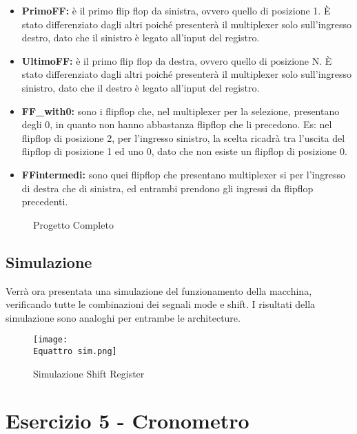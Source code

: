 \documentclass[12pt]{article}
\def \Equattro {Allegati/Esercizio4/}
\begin{document}
\begin{itemize}
    \item \textbf{PrimoFF:} è il primo flip flop da sinistra, ovvero quello di posizione 1. È stato differenziato dagli altri poiché presenterà il multiplexer solo sull’ingresso destro, dato che il sinistro è legato all’input del registro.
    \item \textbf{UltimoFF:} è il primo flip flop da destra, ovvero quello di posizione N. È stato differenziato dagli altri poiché presenterà il multiplexer solo sull’ingresso sinistro, dato che il destro è legato all’input del registro.
    \item \textbf{FF\_with0:} sono i flipflop che, nel multiplexer per la selezione, presentano degli 0, in quanto non hanno abbastanza flipflop che li precedono. Es: nel flipflop di posizione 2, per l’ingresso sinistro, la scelta ricadrà tra l’uscita del flipflop di posizione 1 ed uno 0, dato che non esiste un flipflop di posizione 0.
    \item \textbf{FFintermedi:} sono quei flipflop che presentano multiplexer si per l’ingresso di destra che di sinistra, ed entrambi prendono gli ingressi da flipflop precedenti.
\end{itemize}
\clearpage
\begin{figure}[ht!]
    \centering
    
    \caption{Progetto Completo}
\end{figure}
\subsection{Simulazione}
Verrà ora presentata una simulazione del funzionamento della macchina, verificando tutte le combinazioni dei segnali mode e shift. I risultati della simulazione sono analoghi per entrambe le architecture.
\begin{figure}[ht]
    \centering
    \texttt{[image: \\Equattro sim.png]}
    \caption{Simulazione Shift Register}
\end{figure}
\newpage
\section{Esercizio 5 - Cronometro}
\end{document}
